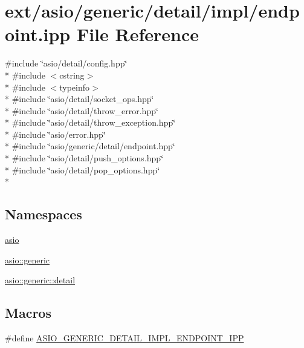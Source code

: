 \hypertarget{generic_2detail_2impl_2endpoint_8ipp}{}\section{ext/asio/generic/detail/impl/endpoint.ipp File Reference}
\label{generic_2detail_2impl_2endpoint_8ipp}
{\ttfamily \#include \char`\"{}asio/detail/config.\+hpp\char`\"{}}\\*
{\ttfamily \#include $<$cstring$>$}\\*
{\ttfamily \#include $<$typeinfo$>$}\\*
{\ttfamily \#include \char`\"{}asio/detail/socket\+\_\+ops.\+hpp\char`\"{}}\\*
{\ttfamily \#include \char`\"{}asio/detail/throw\+\_\+error.\+hpp\char`\"{}}\\*
{\ttfamily \#include \char`\"{}asio/detail/throw\+\_\+exception.\+hpp\char`\"{}}\\*
{\ttfamily \#include \char`\"{}asio/error.\+hpp\char`\"{}}\\*
{\ttfamily \#include \char`\"{}asio/generic/detail/endpoint.\+hpp\char`\"{}}\\*
{\ttfamily \#include \char`\"{}asio/detail/push\+\_\+options.\+hpp\char`\"{}}\\*
{\ttfamily \#include \char`\"{}asio/detail/pop\+\_\+options.\+hpp\char`\"{}}\\*
\subsection*{Namespaces}
\begin{DoxyCompactItemize}
\item 
 \hyperlink{namespaceasio}{asio}
\item 
 \hyperlink{namespaceasio_1_1generic}{asio\+::generic}
\item 
 \hyperlink{namespaceasio_1_1generic_1_1detail}{asio\+::generic\+::detail}
\end{DoxyCompactItemize}
\subsection*{Macros}
\begin{DoxyCompactItemize}
\item 
\#define \hyperlink{generic_2detail_2impl_2endpoint_8ipp_af488dcaa0974297e644c0345fc94112e}{A\+S\+I\+O\+\_\+\+G\+E\+N\+E\+R\+I\+C\+\_\+\+D\+E\+T\+A\+I\+L\+\_\+\+I\+M\+P\+L\+\_\+\+E\+N\+D\+P\+O\+I\+N\+T\+\_\+\+I\+P\+P}
\end{DoxyCompactItemize}
